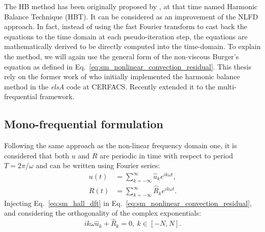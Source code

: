 
The HB method has been originally
proposed by \citet{Hall2002}, at that time named
Harmonic Balance Technique (HBT).
It can be considered as an improvement of the NLFD
approach. In fact, instead
of using the fast Fourier transform to cast back the equations
to the time domain at each pseudo-iteration step, 
the equations are mathematically derived to be directly
computed into the time-domain.
To explain the method, we will again use the general form of 
the non-viscous Burger's equation as defined in
Eq.~\eqref{eq:sm_nonlinear_convection_residual}.
This thesis rely on the former work of \citet{ThesisSicot} who initially
implemented the harmonic balance method in the \textit{elsA}
code at CERFACS. Recently \citet{ThesisGuedeney} extended it to the
multi-frequential framework.

\subsection{Mono-frequential formulation}

Following the same approach as the non-linear frequency domain one,
it is considered that both $u$ and $R$ are periodic
in time with respect to period $T = 2 \pi / \omega$
and can be written using Fourier series:
\begin{equation}
	\begin{split}
		u(t) &= \sum_{k=-\infty}^{\infty} \widehat{u}_k e^{i k \omega t}, \\
		R(t) &= \sum_{k=-\infty}^{\infty} \widehat{R}_k e^{i k \omega t}.
		\label{eq:sm_hall_dft}
	\end{split}
\end{equation}
Injecting Eq.~\eqref{eq:sm_hall_dft} in 
Eq.~\eqref{eq:sm_nonlinear_convection_residual}, and considering
the orthogonality of the complex exponentials:
\begin{equation}
	i k \omega \widehat{u}_k + \widehat{R}_k = 0, \: k \in [-N, N].
	\label{eq:sm_hall_frequential_eq}
\end{equation}

